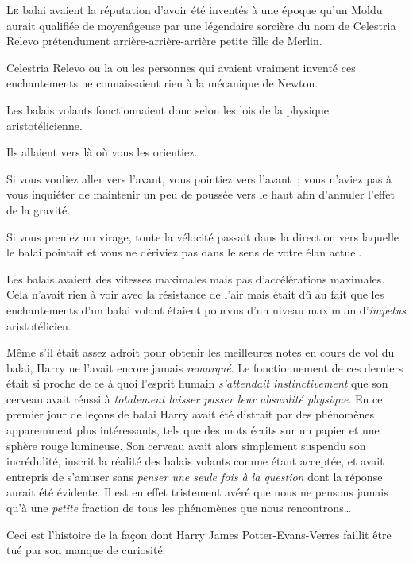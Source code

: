 
\lettrine{L}{e} balai avaient la réputation d'avoir été inventés à une époque qu'un Moldu aurait qualifiée de moyenâgeuse par une légendaire sorcière du nom de Celestria Relevo prétendument arrière-arrière-arrière petite fille de Merlin.

Celestria Relevo ou la ou les personnes qui avaient vraiment inventé ces enchantements ne connaissaient rien à la mécanique de Newton.

Les balais volants fonctionnaient donc selon les lois de la physique aristotélicienne.

Ils allaient vers là où vous les orientiez.

Si vous vouliez aller vers l'avant, vous pointiez vers l'avant~; vous n'aviez pas à vous inquiéter de maintenir un peu de poussée vers le haut afin d'annuler l'effet de la gravité.

Si vous preniez un virage, toute la vélocité passait dans la direction vers laquelle le balai pointait et vous ne dériviez pas dans le sens de votre élan actuel.

Les balais avaient des vitesses maximales mais pas d'accélérations maximales. Cela n'avait rien à voir avec la résistance de l'air mais était dû au fait que les enchantements d'un balai volant étaient pourvus d'un niveau maximum d'\emph{impetus} aristotélicien.

Même s'il était assez adroit pour obtenir les meilleures notes en cours de vol du balai, Harry ne l'avait encore jamais \emph{remarqué}. Le fonctionnement de ces derniers était si proche de ce à quoi l'esprit humain \emph{s'attendait instinctivement} que son cerveau avait réussi à \emph{totalement laisser passer leur absurdité physique}. En ce premier jour de leçons de balai Harry avait été distrait par des phénomènes apparemment plus intéressants, tels que des mots écrits sur un papier et une sphère rouge lumineuse. Son cerveau avait alors simplement suspendu son incrédulité, inscrit la réalité des balais volants comme étant acceptée, et avait entrepris de s'amuser sans \emph{penser une seule fois à la question} dont la réponse aurait été évidente. Il est en effet tristement avéré que nous ne pensons jamais qu'à une \emph{petite} fraction de tous les phénomènes que nous rencontrons…

Ceci est l'histoire de la façon dont Harry James Potter-Evans-Verres faillit être tué par son manque de curiosité.

